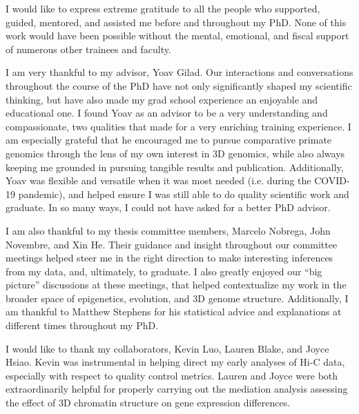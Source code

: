 \acknowledgments

I would like to express extreme gratitude to all the people who supported, guided, mentored, and assisted me before and throughout my PhD. None of this work would have been possible without the mental, emotional, and fiscal support of numerous other trainees and faculty.

I am very thankful to my advisor, Yoav Gilad. Our interactions and conversations throughout the course of the PhD have not only significantly shaped my scientific thinking, but have also made my grad school experience an enjoyable and educational one. I found Yoav as an advisor to be a very understanding and compassionate, two qualities that made for a very enriching training experience. I am especially grateful that he encouraged me to pursue comparative primate genomics through the lens of my own interest in 3D genomics, while also always keeping me grounded in pursuing tangible results and publication. Additionally, Yoav was flexible and versatile when it was most needed (i.e. during the COVID-19 pandemic), and helped ensure I was still able to do quality scientific work and graduate. In so many ways, I could not have asked for a better PhD advisor.

I am also thankful to my thesis committee members, Marcelo Nobrega, John Novembre, and Xin He. Their guidance and insight throughout our committee meetings helped steer me in the right direction to make interesting inferences from my data, and, ultimately, to graduate. I also greatly enjoyed our ``big picture'' discussions at these meetings, that helped contextualize my work in the broader space of epigenetics, evolution, and 3D genome structure. Additionally, I am thankful to Matthew Stephens for his statistical advice and explanations at different times throughout my PhD.

I would like to thank my collaborators, Kevin Luo, Lauren Blake, and Joyce Hsiao. Kevin was instrumental in helping direct my early analyses of Hi-C data, especially with respect to quality control metrics. Lauren and Joyce were both extraordinarily helpful for properly carrying out the mediation analysis assessing the effect of 3D chromatin structure on gene expression differences.

